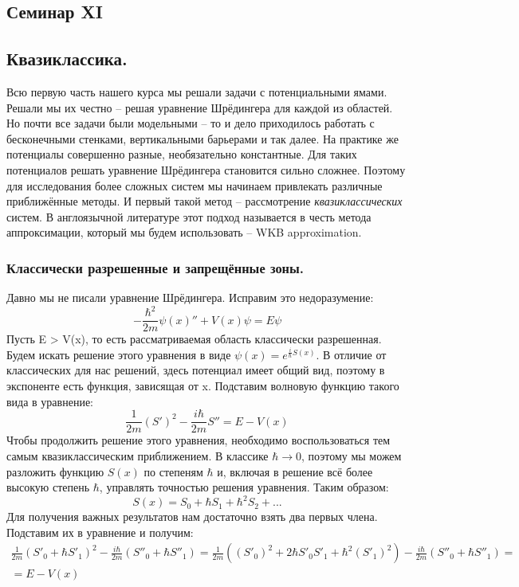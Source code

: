 \begin{center}
    \section{Семинар XI}
\end{center}
\subsection{Квазиклассика.}

Всю первую часть нашего курса мы решали задачи с потенциальными ямами. Решали мы их честно -- решая уравнение Шрёдингера для каждой из областей. Но почти все задачи были модельными -- то и дело приходилось работать с бесконечными стенками, вертикальными барьерами и так далее. На практике же потенциалы совершенно разные, необязательно константные. Для таких потенциалов решать уравнение Шрёдингера становится сильно сложнее. Поэтому для исследования более сложных систем мы начинаем привлекать различные приближённые методы. И первый такой метод -- рассмотрение \textit{квазиклассических} систем. В англоязычной литературе этот подход называется в честь метода аппроксимации, который мы будем использовать -- WKB approximation.

\subsubsection{Классически разрешенные и запрещённые зоны.}

Давно мы не писали уравнение Шрёдингера. Исправим это недоразумение:
\[
-\frac{\hbar^2}{2m}\psi(x)'' + V(x)\psi = E\psi
\]
Пусть E > V(x), то есть рассматриваемая область классически разрешенная. Будем искать решение этого уравнения в виде $\psi(x) = e^{\frac{i}{\hbar}S(x)}$. В отличие от классических для нас решений, здесь потенциал имеет общий вид, поэтому в экспоненте есть функция, зависящая от x. Подставим волновую функцию такого вида в уравнение:
\[
\frac{1}{2m}(S')^2 - \frac{i\hbar}{2m}S'' = E - V(x)
\]
Чтобы продолжить решение этого уравнения, необходимо воспользоваться тем самым квазиклассическим приближением. В классике $\hbar \rightarrow 0$, поэтому мы можем разложить функцию $S(x)$ по степеням $\hbar$ и, включая в решение всё более высокую степень $\hbar$, управлять точностью решения уравнения. Таким образом:
\[
S(x) = S_0 + \hbar S_1 + \hbar^2 S_2 + ...
\]
Для получения важных результатов нам достаточно взять два первых члена. Подставим их в уравнение и получим:
\begin{multline*}
\frac{1}{2m}\left( S'_0 + \hbar S'_1 \right)^2 - \frac{i\hbar}{2m}(S''_0 + \hbar S''_1) = \frac{1}{2m}\left( (S'_0)^2 + 2\hbar S'_0 S'_1 + \hbar^2 (S'_1)^2 \right) - \frac{i\hbar}{2m}(S''_0 + \hbar S''_1) = \\ = E - V(x)
\end{multline*}

